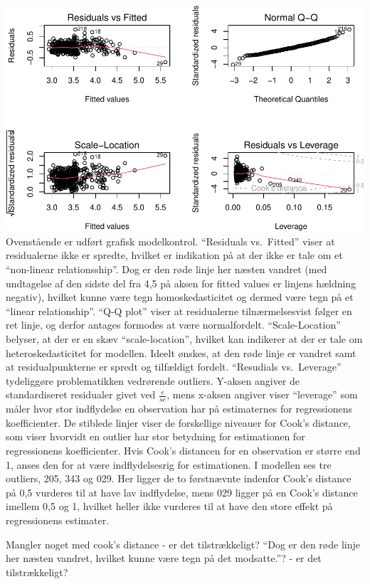 \documentclass[
]{article}
\begin{document}
\includegraphics{Eksamensopgave-1_files/figure-latex/unnamed-chunk-3-1.pdf}
Ovenstående er udført grafisk modelkontrol. ``Residuals vs.~Fitted''
viser at residualerne ikke er spredte, hvilket er indikation på at der
ikke er tale om et ``non-linear relationsship''. Dog er den røde linje
her næsten vandret (med undtagelse af den sidste del fra 4,5 på aksen
for fitted values er linjens hældning negativ), hvilket kunne være tegn
homoskedasticitet og dermed være tegn på et ``linear relationship''.
``Q-Q plot'' viser at residualerne tilnærmelsesvist følger en ret linje,
og derfor antages formodes at være normalfordelt. ``Scale-Location''
belyser, at der er en skæv ``scale-location'', hvilket kan indikerer at
der er tale om heteroskedasticitet for modellen. Ideelt ønskes, at den
røde linje er vandret samt at residualpunkterne er spredt og tilfældigt
fordelt. ``Resudials vs.~Leverage'' tydeliggøre problematikken
vedrørende outliers. Y-aksen angiver de standardiseret residualer givet
ved \(\frac {e}{se}\), mens x-aksen angiver viser ``leverage'' som måler
hvor stor indflydelse en observation har på estimaternes for
regressionens koefficienter. De stiblede linjer viser de forskellige
niveauer for Cook's distance, som viser hvorvidt en outlier har stor
betydning for estimationen for regressionens koefficienter. Hvis Cook's
distancen for en observation er større end 1, anses den for at være
indflydelsesrig for estimationen. I modellen ses tre outliers, 205, 343
og 029. Her ligger de to førstnævnte indenfor Cook's distance på 0,5
vurderes til at have lav indflydelse, mens 029 ligger på en Cook's
distance imellem 0,5 og 1, hvilket heller ikke vurderes til at have den
store effekt på regressionens estimater.

Mangler noget med cook's distance - er det tilstrækkeligt? ``Dog er den
røde linje her næsten vandret, hvilket kunne være tegn på det
modsatte.''? - er det tilstrækkeligt?
\end{document}
